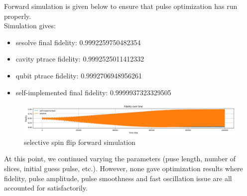 \documentclass{article}
\begin{document}
Forward simulation is given below to ensure that pulse optimization has run properly. 
\\
Simulation gives: 
\begin{itemize}
    \item sesolve final fidelity:  0.9992259750482354
    \item cavity ptrace fidelity:  0.9992525011412332
    \item qubit ptrace fidelity:  0.9992706948956261
    \item self-implemented final fidelity:  0.9999937323329505
\end{itemize}
\begin{figure}[H]
    \centering
    \includegraphics[width=0.6\linewidth]{selective_spin_flip_GRAPE_500,_100_000_LIN_constraints_simulation.png}
    \caption{selective spin flip forward simulation}
    \label{fig:selective_spin_flip_constraints_forward_simulation}
\end{figure}

At this point, we continued varying the parameters (puse length, number of slices, initial guess pulse, etc.). 
However, none gave optimization results where fidelity, pulse amplitude, pulse smoothness and fast oscillation issue 
are all accounted for satisfactorily. 

\end{document}
